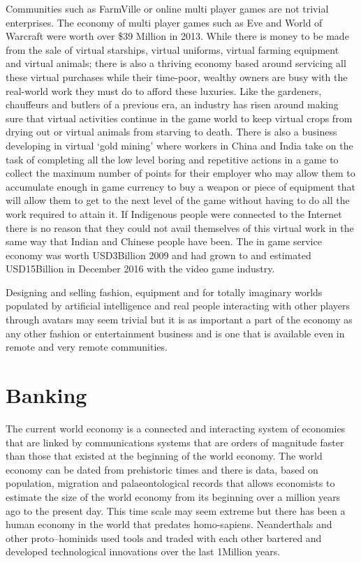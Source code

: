 Communities such as FarmVille or online multi player games are not trivial enterprises. The economy of multi player games such as Eve and World of Warcraft were worth over \$39 Million in 2013. While there is money to be made from the sale of virtual starships, virtual uniforms, virtual farming equipment and virtual animals; there is also a thriving economy based around servicing all these virtual purchases while their time-poor, wealthy owners are busy with the real-world work they must do to afford these luxuries. Like the gardeners, chauffeurs and butlers of a previous era, an industry has risen around making sure that virtual activities continue in the game world to keep virtual crops from drying out or virtual animals from starving to death. There is also a business developing in virtual `gold mining' where workers in China and India take on the task of completing all the low level boring and repetitive actions in a game to collect the maximum number of points for their employer who may allow them to accumulate enough in game currency to buy a weapon or piece of equipment that will allow them to get to the next level of the game without having to do all the work required to attain it. If Indigenous people were connected to the Internet there is no reason that they could not avail themselves of this virtual work in the same way that Indian and Chinese people have been. The in game service economy was worth USD3Billion 2009\cite[p42]{RefWorks:193} and had grown to and estimated USD15Billion in December 2016\cite{VB2016} with the video game industry. 

Designing and selling fashion, equipment and for totally imaginary worlds populated by artificial intelligence and real people interacting with other players through avatars may seem trivial but it is as important a part of the economy as any other fashion or entertainment business and is one that is available even in remote and very remote communities.

\section{Banking}
The current world economy is a connected and interacting system of economies that are linked by communications systems that are orders of magnitude faster than those that existed at the beginning of the world economy. The world economy can be dated from prehistoric times and there is data, based on population, migration and palaeontological records that allows economists to estimate the size of the world economy from its beginning over a million years ago to the present day. This time scale may seem extreme but there has been a human economy in the world that predates homo-sapiens.  Neanderthals and other proto--hominids used tools and traded with each other bartered and developed technological innovations over the last 1Million years\cite[p683]{RefWorks:247}.


